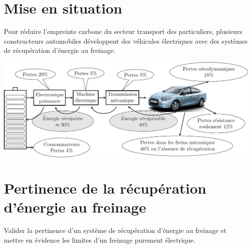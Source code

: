 \documentclass[10pt,fleqn]{article} %
\begin{document}

\vspace{4.5cm}
\pagestyle{fancy}
\thispagestyle{plain}


\def\columnseprulecolor{\color{ocre}}
\setlength{\columnseprule}{0.4pt} 

\ifprof
\else
\begin{multicols}{2}
\fi

\section*{Mise en situation}
\ifprof
\else
Pour réduire l’empreinte carbone du secteur transport des particuliers, plusieurs constructeurs automobiles
développent des véhicules électriques avec des systèmes de récupération d’énergie au freinage. %


\begin{center}
\includegraphics[width=\linewidth]{images/fig_01}
\end{center}

\section*{Pertinence de la récupération d'énergie au freinage}
\begin{obj}
Valider la pertinence d’un système de récupération d’énergie au freinage et mettre en évidence les
limites d’un freinage purement électrique.
\end{obj}


\end{multicols}
\end{document}
